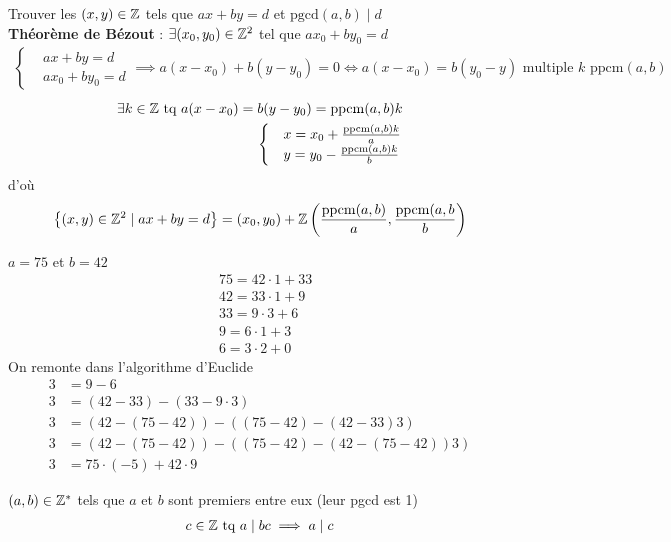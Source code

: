 Trouver les $(x, y) \in \mathbb{Z}$ tels que $ax + by = d$ et $\mathrm{pgcd}(a, b) \mid d$
\\
\textbf{Théorème de Bézout} : $\exists (x_0, y_0) \in \mathbb{Z}^2$ tel que $ax_0 + by_0 = d$
\begin{align*}
\begin{cases}
&ax + by = d \\
&ax_0 + by_0 = d
\end{cases}
\implies 
a(x - x_0) + b(y - y_0) = 0 \iff a(x - x_0) = b(y_0 - y) \text{ multiple  }k \text{ ppcm}(a,b)
\end{align*}
\begin{align*}
\exists k \in \mathbb{Z} \text{ tq } a(x - x_0) = b(y - y_0) = \mathrm{ppcm}(a, b)k \\
\begin{cases}
&x = x_0 + \frac{\mathrm{ppcm}(a, b)k}{a} \\
&y = y_0 - \frac{\mathrm{ppcm}(a,b)k}{b}
\end{cases}
\end{align*}
d'où 
\begin{align*}
\left\{ (x,y) \in \mathbb{Z}^2 \mid ax + by = d \right\} = (x_0, y_0) + \mathbb{Z} \left( \frac{\mathrm{ppcm}(a, b)}{a}, \frac{\mathrm{ppcm}(a, b}{b}\right)
\end{align*}

\begin{exemple}
$a = 75$ et $b = 42$ \\
\begin{align*}
&75 = 42 \cdot 1 + 33 \\
&42 = 33 \cdot 1 + 9 \\
&33 = 9 \cdot 3 + 6 \\
&9 = 6 \cdot 1 + 3\\
&6 = 3 \cdot 2 + 0
\end{align*}
On remonte dans l'algorithme d'Euclide
\begin{align*}
3 &= 9 - 6  \\
3 &= (42 - 33) - (33 - 9 \cdot 3) \\
3 &= (42 - (75 - 42)) - ((75 - 42) - (42 - 33) 3)  \\
3 &= (42 - (75 - 42)) - ((75 - 42) - (42 - (75 - 42))3) \\
3 &= 75 \cdot (-5) + 42 \cdot 9 
\end{align*}
\end{exemple}

\begin{graybox}
\begin{lemme}
$(a, b) \in \mathbb{Z}^*$ tels que $a$ et $b$ sont premiers entre eux (leur pgcd est 1)
\begin{align*}
c \in \mathbb{Z} \text{ tq } a \mid bc \implies a \mid c
\end{align*}
\end{lemme}
\end{graybox}

